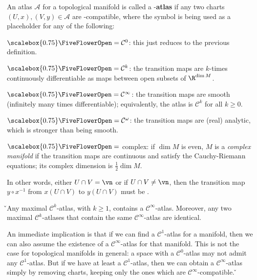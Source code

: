 An atlas $\mathscr{A}$ for a topological manifold is called a {\scalebox{0.75}\FiveFlowerOpen}-\textbf{atlas} if any
two charts $(U,x), (V,y) \in \mathscr{A}$ are {\scalebox{0.75}\FiveFlowerOpen}-compatible, where the symbol
{\scalebox{0.75}\FiveFlowerOpen} is being used as a placeholder for any of the following:
\bit
\item ${\scalebox{0.75}\FiveFlowerOpen} = \mathcal{C}^0$: this just reduces to the previous definition.
\item ${\scalebox{0.75}\FiveFlowerOpen} = \mathcal{C}^k$: the transition maps are $k$-times continuously differentiable
as maps between open subsets of $\R^{\dim M}$.
\item ${\scalebox{0.75}\FiveFlowerOpen} = \mathcal{C}^\infty$: the transition maps are smooth (infinitely many times
differentiable); equivalently, the atlas is $\mathcal{C}^k$ for all $k\geq 0$.
\item ${\scalebox{0.75}\FiveFlowerOpen} = \mathcal{C}^\omega$: the transition maps are (real) analytic, which is
stronger than being smooth.
\item ${\scalebox{0.75}\FiveFlowerOpen} =$ complex: if $\dim M$ is even, $M$ is a \emph{complex manifold} if the
transition maps are continuous and satisfy the Cauchy-Riemann equations; its complex dimension is $\tfrac{1}{2}\dim M$.
\eit

\ed

In other words, either $U\cap V = \vn$ or if $U\cap V \neq \vn$, then the transition map $y\circ x^{-1}$ from
$x(U\cap V)$ to $y(U\cap V)$ must be {\scalebox{0.75}\FiveFlowerOpen}.

\bse
{}
\ese

\v

\bt[Whitney] Any maximal $\mathcal{C}^k$-atlas, with $k\geq 1$, contains a $\mathcal{C}^\infty$-atlas. Moreover, any
two maximal $\mathcal{C}^k$-atlases that contain the same $\mathcal{C}^\infty$-atlas are identical.
\et

An immediate implication is that if we can find a $\mathcal{C}^1$-atlas for a manifold, then we can also assume the
existence of a $\mathcal{C}^\infty$-atlas for that manifold. This is not the case for topological manifolds in
general: a space with a $\mathcal{C}^0$-atlas may not admit any $\mathcal{C}^1$-atlas. But if we have at least a
$\mathcal{C}^1$-atlas, then we can obtain a $\mathcal{C}^\infty$-atlas simply by removing charts, keeping only the
ones which are $\mathcal{C}^\infty$-compatible. \v

